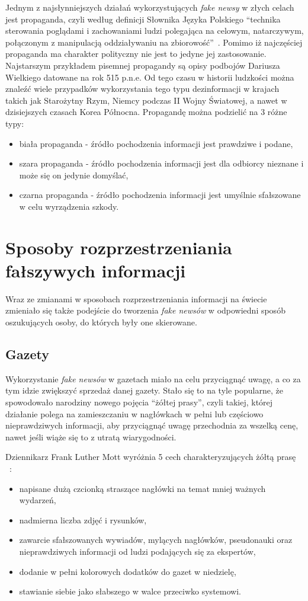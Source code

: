Jednym z najsłynniejszych działań wykorzystujących \textit{fake newsy} w złych celach jest propaganda, czyli według 
definicji Słownika Języka Polskiego ``technika sterowania poglądami i zachowaniami ludzi polegająca na 
celowym, natarczywym, połączonym z manipulacją oddziaływaniu na zbiorowość''~\cite{SJP}.
Pomimo iż najczęściej propaganda ma charakter polityczny nie jest to jedyne 
jej zastosowanie. Najstarszym przykładem pisemnej propagandy są opisy podbojów
Dariusza Wielkiego datowane na rok 515 p.n.e. Od tego czasu w historii ludzkości
można znaleźć wiele przypadków wykorzystania tego typu dezinformacji w krajach takich
jak Starożytny Rzym, Niemcy podczas II Wojny Światowej, a nawet w dzisiejszych 
czasach Korea Północna.
Propagandę można podzielić na 3 różne typy:
\begin{itemize}
    \item biała propaganda - źródło pochodzenia informacji jest prawdziwe i podane,
    \item szara propaganda - źródło pochodzenia informacji jest dla odbiorcy nieznane i może się on jedynie domyślać,
    \item czarna propaganda - źródło pochodzenia informacji jest umyślnie sfałszowane w celu wyrządzenia szkody.
\end{itemize}

\newpage
\section{Sposoby rozprzestrzeniania fałszywych informacji}
Wraz ze zmianami w sposobach rozprzestrzeniania informacji na świecie zmieniało się
także podejście do tworzenia \textit{fake newsów} w odpowiedni sposób oszukujących osoby, do których 
były one skierowane. 

\subsection{Gazety}
Wykorzystanie \textit{fake newsów} w gazetach miało na celu przyciągnąć uwagę, a co za 
tym idzie zwiększyć sprzedaż danej gazety. Stało się to na tyle popularne, że spowodowało
narodziny nowego pojęcia ``żółtej prasy'', czyli takiej, której działanie polega na zamieszczaniu 
w nagłówkach w pełni lub częściowo nieprawdziwych informacji, aby przyciągnąć uwagę przechodnia 
za wszelką cenę, nawet jeśli wiąże się to z utratą wiarygodności. 

Dziennikarz Frank Luther Mott wyróżnia 5 cech charakteryzujących 
żółtą prasę ~\cite{YellowPressFrank}:
\begin{itemize}
    \item napisane dużą czcionką straszące nagłówki na temat mniej ważnych wydarzeń,
    \item nadmierna liczba zdjęć i rysunków,
    \item zawarcie sfałszowanych wywiadów, mylących nagłówków, pseudonauki oraz nieprawdziwych informacji od ludzi podających się za ekspertów,
    \item dodanie w pełni kolorowych dodatków do gazet w niedzielę,
    \item stawianie siebie jako słabszego w walce przeciwko systemowi.
\end{itemize}

